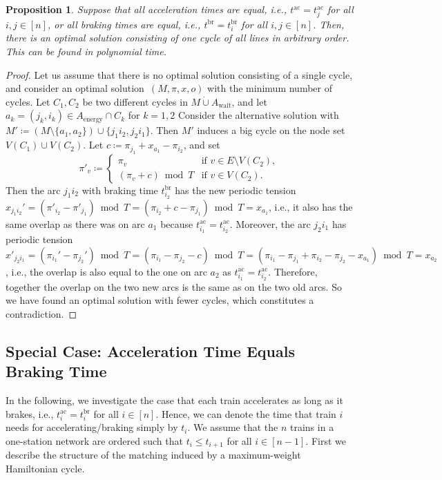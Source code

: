 \documentclass[11pt,a4paper]{article}
\newcommand{\dotcup}{\mathbin{\dot\cup}}
\newcommand{\wait}{\mathrm{wait}}
\newcommand{\energy}{\mathrm{energy}}
\newcommand{\energyact}{M}               %
\newcommand{\ac}{\mathrm{ac}}
\newcommand{\br}{\mathrm{br}}
\newtheorem{proposition}[theorem]{Proposition}
\theoremstyle{definition}
\theoremstyle{remark}
\begin{document}
\begin{proposition}\label{prop:specialcase1}
	Suppose that all acceleration times are equal, i.e., $t^{\ac} = t^{\ac}_j$ for all $i,j \in [n]$, or all braking times are equal, i.e., $t^{\br} = t^{\br}_i$ for all $i,j \in [n]$. Then, there is an optimal solution consisting of one cycle of all lines in arbitrary order. This can be found in polynomial time.
\end{proposition}

\begin{proof}
	Let us assume that there is no optimal solution consisting of a single cycle, and consider an optimal solution~$(\energyact, \pi, x, o)$ with the minimum number of cycles. Let $C_1, C_2$ be two different cycles in $\energyact \dotcup A_\wait$, and let $a_k = (j_k, i_k) \in A_{\energy} \cap C_k$ for $k=1,2$ 
    Consider the alternative solution with $\energyact' \coloneqq (\energyact \setminus \{a_1, a_2\}) \cup \{j_1i_2, j_2i_1\}$. Then $\energyact'$ induces a big cycle on the node set $V(C_1) \cup V(C_2)$. Let $c \coloneqq \pi_{j_1} + x_{a_1} - \pi_{i_2}$, and set
	\[
	\pi'_v \coloneqq
	\begin{cases}
		\pi_v &\text{if } v \in E\setminus V(C_2), \\
		(\pi_v + c) \bmod T &\text{if } v \in V(C_2).
	\end{cases}
	\]
	Then the arc $j_1i_2$ with braking time $t^{\br}_{i_2} $ has the new periodic tension $x_{j_1i_2}' = (\pi'_{i_2}- \pi'_{j_1})\bmod T = (\pi_{i_2} + c - \pi_{j_1})\bmod T = x_{a_1}$, i.e.,  it also has the same overlap as there was on arc $a_1$ because $t^{\ac}_{i_1} = t^{\ac}_{i_2}$.
    Moreover, the arc $j_2i_1$ has periodic tension
	$x'_{j_2i_1} = (\pi_{i_1}' - \pi_{j_2}') \bmod T = (\pi_{i_1} - \pi_{j_2} - c) \bmod T = (\pi_{i_1} - \pi_{j_1} + \pi_{i_2} - \pi_{j_2} - x_{a_1}) \bmod T = x_{a_2}$, i.e., the overlap is also equal to the one on arc $a_2$ as $t^{\ac}_{i_1} = t^{\ac}_{i_2}$. Therefore, together the overlap on the two new arcs is the same as on the two old arcs. So we have found an optimal solution with fewer cycles, which constitutes a contradiction.
\end{proof}



\subsection{Special Case: Acceleration Time Equals Braking Time}

In the following, we investigate the case that each train accelerates as long as it brakes, i.e., $t_i^{\ac} = t_i^{\br}$ for all $i \in [n]$. Hence, we can denote the time that train $i$ needs for accelerating/braking simply by $t_i$. We assume that the $n$ trains in a one-station network are ordered such that $t_i \leq t_{i+1}$ for all $i \in [n-1]$. 
First we describe the structure of the matching induced by a maximum-weight Hamiltonian cycle.
\end{document}
